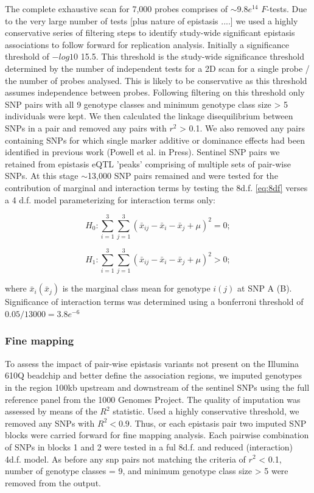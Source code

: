 \documentclass[paper=a4, fontsize=11pt]{scrartcl}	%
\numberwithin{equation}{section}									%
\numberwithin{figure}{section}										%
\numberwithin{table}{section}										%
\begin{document}
The complete exhaustive scan for 7,000 probes comprises of $\sim$9.8$e^{14}$ $F$-tests. Due to the very large number of tests [plus nature of epistasis ....] we used a highly conservative series of filtering steps to identify study-wide significant epistasis associations to follow forward for replication analysis. Initially a significance threshold of $-log10$ 15.5. This threshold is the study-wide significance threshold determined by the number of independent tests for a 2D scan for a single probe / the number of probes analysed. This is likely to be conservative as this threshold assumes independence between probes. Following filtering on this threshold only SNP pairs with all 9 genotype classes and minimum genotype class size > 5 individuals were kept. We then calculated the linkage disequilibrium between SNPs in a pair and removed any pairs with $r^2$ > 0.1. We also removed any pairs containing SNPs for which single marker additive or dominance effects had been identified  in previous work (Powell et al. in Press). Sentinel  SNP pairs we retained from epistasis eQTL 'peaks' comprising of multiple sets of pair-wise SNPs. At this stage $\sim$13,000 SNP pairs remained and were tested for the contribution of marginal and interaction terms by testing the 8d.f. \ref{eq:8df} verses a 4 d.f. model parameterizing for interaction terms only:

\begin{equation}
H _0: \sum _{i=1} ^3 \sum _{j=1} ^3 (\bar x _{ij} - \bar x _i - \bar x _j + \mu) ^2 = 0;
\end{equation}

\begin{equation}
H _1: \sum _{i=1} ^3 \sum _{j=1} ^3 (\bar x _{ij} - \bar x _i - \bar x _j + \mu) ^2 > 0;
\label{eq:4df}
\end{equation}

where $\bar x _i (\bar x _j)$ is the marginal class mean for genotype $i (j)$ at SNP A (B). Significance of interaction terms was determined using a bonferroni threshold of $0.05 / 13000 = 3.8e^{-6}$ 


\subsubsection{Fine mapping}

To assess the impact of pair-wise epistasis variants not present on the Illumina 610Q beadchip and better define the association regions, we imputed genotypes in the region 100kb upstream and downstream of the sentinel SNPs using the full reference panel from the 1000 Genomes Project. The quality of imputation was assessed by means of the $R^2$ statistic. Used a highly conservative threshold, we removed any SNPs with $R^2 < 0.9$. Thus, or each epistasis pair two imputed SNP blocks were carried forward for fine mapping analysis. Each pairwise combination of SNPs in blocks 1 and 2 were tested in a ful 8d.f. and reduced (interaction) 4d.f. model. As before any snp pairs not matching the criteria of $r^2$  < 0.1, number of genotype classes = 9, and minimum genotype class size > 5 were removed from the output. 
\end{document}
